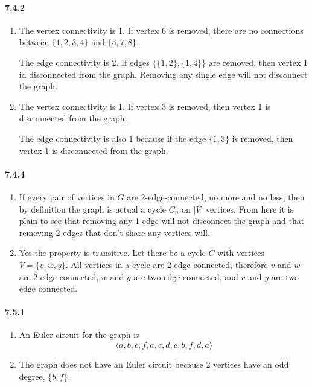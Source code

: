 \documentclass[11pt, letterpaper, twocolumn, fleqn]{article}
\begin{document}
\paragraph{7.4.2}
\begin{enumerate}
  \item The vertex connectivity is 1. If vertex 6 is removed, there are no connections between $\{1,2,3,4\}$ and $\{5,7,8\}$.
  
  The edge connectivity is 2. If edges $\{\{1,2\},\{1,4\}\}$ are removed, then vertex 1 id disconnected from the graph. Removing any single edge will not disconnect the graph.
  
  \item The vertex connectivity is 1. If vertex 3 is removed, then vertex 1 is disconnected from the graph. 
  
  The edge connectivity is also 1 because if the edge $\{1,3\}$ is removed, then vertex 1 is disconnected from the graph.
\end{enumerate}

\paragraph{7.4.4}
\begin{enumerate}
  \item If every pair of vertices in $G$ are 2-edge-connected, no more and no less, then by definition the graph is actual a cycle $C_n$ on $|V|$ vertices. From here it is plain to see that removing any 1 edge will not disconnect the graph and that removing 2 edges that don't share any vertices will.
  
  \item Yes the property is transitive. Let there be a cycle $C$ with vertices $V = \{v,w,y\}$. All vertices in a cycle are 2-edge-connected, therefore $v$ and $w$ are 2 edge connected, $w$ and $y$ are two edge connected, and $v$ and $y$ are two edge connected.
\end{enumerate}

\paragraph{7.5.1}
\begin{enumerate}
  \item An Euler circuit for the graph is 
    $$\langle a,b,c,f,a,c,d,e,b,f,d,a \rangle$$
    
  \item The graph does not have an Euler circuit because 2 vertices have an odd degree, $\{b,f\}$.
\end{enumerate}
\end{document}
